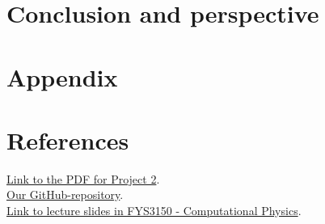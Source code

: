 \documentclass{article}
\begin{document}
\vspace{1cm}

\section{Conclusion and perspective} \label{sec:Conclusion}



\vspace{1cm}

\section{Appendix} \label{sec:Appendix}

\iffalse
\begin{figure}[ht]
	\centering
	\texttt{[image: program/data10.png]}
	\caption{The plot of the different algorithms for $n = 10$. }
  \label{fig:data10png}
\end{figure}
\fi



\clearpage

\vspace{1cm}

\section{References} \label{sec:References}


\href{https://github.com/CompPhysics/ComputationalPhysics/blob/master/doc/Projects/2019/Project2/pdf/Project2.pdf}{Link to the PDF for Project 2}. \\

\href{https://github.com/Erikbgram/Fys3150}{Our GitHub-repository}. \\

\href{https://github.com/CompPhysics/ComputationalPhysics/blob/master/doc/Lectures/lectures2015.pdf}{Link to lecture slides in FYS3150 - Computational Physics}.






\end{document}
